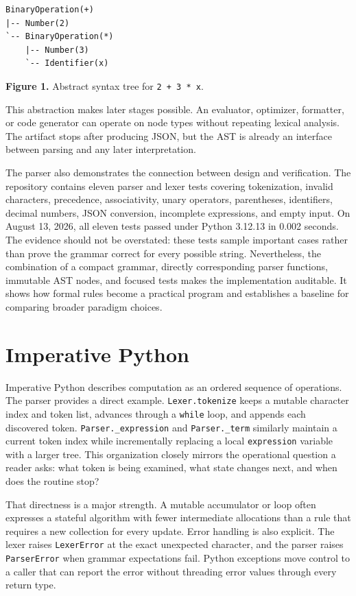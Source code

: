 \documentclass[12pt]{article}
\begin{document}
\begin{lstlisting}
BinaryOperation(+)
|-- Number(2)
`-- BinaryOperation(*)
    |-- Number(3)
    `-- Identifier(x)
\end{lstlisting}

\begin{center}\textbf{Figure 1.} Abstract syntax tree for \texttt{2\ +\ 3\ *\ x}.\end{center}

This abstraction makes later stages possible. An evaluator, optimizer, formatter, or code generator can operate on node types without repeating lexical analysis. The artifact stops after producing JSON, but the AST is already an interface between parsing and any later interpretation.


The parser also demonstrates the connection between design and verification. The repository contains eleven parser and lexer tests covering tokenization, invalid characters, precedence, associativity, unary operators, parentheses, identifiers, decimal numbers, JSON conversion, incomplete expressions, and empty input. On August 13, 2026, all eleven tests passed under Python 3.12.13 in 0.002 seconds. The evidence should not be overstated: these tests sample important cases rather than prove the grammar correct for every possible string. Nevertheless, the combination of a compact grammar, directly corresponding parser functions, immutable AST nodes, and focused tests makes the implementation auditable. It shows how formal rules become a practical program and establishes a baseline for comparing broader paradigm choices.


\section{Imperative Python}

Imperative Python describes computation as an ordered sequence of operations. The parser provides a direct example. \texttt{Lexer.tokenize} keeps a mutable character index and token list, advances through a \texttt{while} loop, and appends each discovered token. \texttt{Parser.\_expression} and \texttt{Parser.\_term} similarly maintain a current token index while incrementally replacing a local \texttt{expression} variable with a larger tree. This organization closely mirrors the operational question a reader asks: what token is being examined, what state changes next, and when does the routine stop?


That directness is a major strength. A mutable accumulator or loop often expresses a stateful algorithm with fewer intermediate allocations than a rule that requires a new collection for every update. Error handling is also explicit. The lexer raises \texttt{LexerError} at the exact unexpected character, and the parser raises \texttt{ParserError} when grammar expectations fail. Python exceptions move control to a caller that can report the error without threading error values through every return type.
\end{document}

